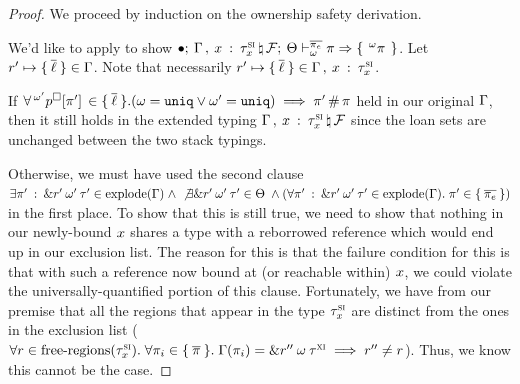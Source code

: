 \begin{proof}
  We proceed by induction on the ownership safety derivation.

  \vspace{1em}
  \noindent \framebox[\textwidth]{ \figuresize
    \begin{mathpar}
      \OSafePlace
    \end{mathpar}
  } \vspace{1em}

  We'd like to apply  to show
  $\bullet; \:  
      \Gamma \, , \: x \: : \: \tau^\textsc{si}_x
     \, \natural \, \mathcal{F} ; \: \Theta \vdash^{ \overline{\pi_e} }_{\omega}  \pi  \Rightarrow 
    \{ \: \,^{\omega}\pi\, \: \} $. Let
  $r^\prime \mapsto \{ \: \overline{\ell} \: \} \in \Gamma$. Note that
  necessarily $r^\prime \mapsto \{ \: \overline{\ell} \: \} \in
  \Gamma \, , \: x \: : \: \tau^\textsc{si}_x$.

  If $\forall \,^{\omega^\prime}p^\square[\pi^\prime]\, \in
  \{ \: \overline{\ell} \: \}. (\omega = \mathtt{uniq} \vee \omega^\prime = \mathtt{uniq})
  \implies \pi^\prime \, \# \, \pi$ held in our original
  $\Gamma$, then it still holds in the extended typing $
    \Gamma \, , \: x \: : \: \tau^\textsc{si}_x  \, \natural \, \mathcal{F}$
  since the loan sets are unchanged between the two stack typings.

  Otherwise, we must have used the second clause $\exists
  \pi^\prime \: : \: \& r^\prime \: \omega^\prime \: \tau^\prime
  \in \textrm{explode}(\Gamma) \; \wedge \; \not \exists
  \& r^\prime \: \omega^\prime \: \tau^\prime \in \Theta \;
  \wedge (\forall
  \pi^\prime \: : \: \& r^\prime \: \omega^\prime \: \tau^\prime
  \in \textrm{explode}(\Gamma). \; \pi^\prime \in \{ \: 
    \overline{\pi_e}  \: \})$ in the first place. To show that this is still
  true, we need to show that nothing in our newly-bound $x$ shares a type
  with a reborrowed reference which would end up in our exclusion list. The
  reason for this is that the failure condition for this is that with such a
  reference now bound at (or reachable within) $x$, we could violate the
  universally-quantified portion of this clause. Fortunately, we have from our
  premise that all the regions that appear in the type $\tau^\textsc{si}_x$ are
  distinct from the ones in the exclusion list ($\forall r \in
  \textrm{free-regions}(\tau^\textsc{si}_x). \; \forall \pi_i \in
  \{ \: \overline{\pi} \: \}. \; \Gamma(\pi_i) =
  \& r^{\prime\prime} \: \omega \: \tau^\textsc{xi} \implies
  r^{\prime\prime} \neq r$). Thus, we know this cannot be the
  case.


\end{proof}
